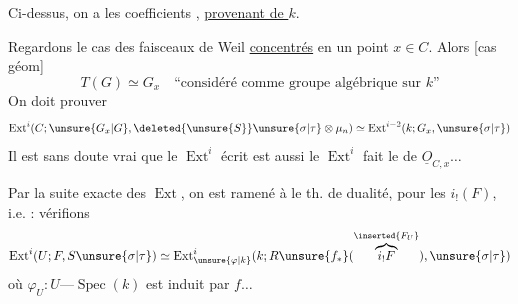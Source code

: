 Ci-dessus, on a  les coefficients  , \uline{provenant de $k$}.

Regardons le cas des faisceaux de Weil \uline{concentrés} en un point $x\in C$. Alors  [cas géom]
\[
T(G)\simeq G_x\quad\text{``considéré comme groupe algébrique sur $k$''}
\]
On doit prouver
\[
\operatorname{Ext}^i(C;\unsure{G_x|G},\deleted{\unsure{S}}\unsure{\sigma|\tau}\otimes\mu_n)\simeq
\operatorname{Ext}^{i-2}(k;G_x,\unsure{\sigma|\tau})
\]
Il est sans doute vrai que le $\operatorname{Ext}^i$ écrit est aussi le $\operatorname{Ext}^i$  fait  le  de $\underline O_{C,x}\ldots$

Par la suite exacte des $\operatorname{Ext}$, on est ramené à 
le th. de dualité,  pour les  $i_!(F)$, i.e. : vérifions
\[
\operatorname{Ext}^i(U;F,S\unsure{\sigma|\tau})\simeq
\operatorname{Ext}^{i}_{\unsure{\varphi|k}}(k;R\unsure{f_*}(\overset{\inserted{F_U}}{\overbrace{i_!F}}),\unsure{\sigma|\tau})
\]
où $\varphi_U:U\text{---}\operatorname{Spec}(k)$ est induit par $f\ldots$


